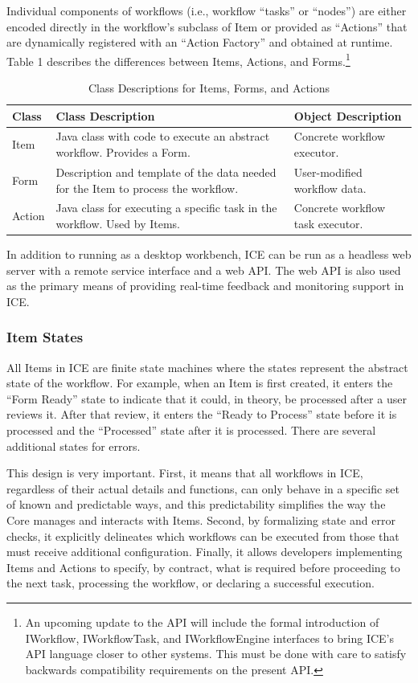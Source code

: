 Individual components of workflows (i.e., workflow ``tasks'' or
``nodes'') are either encoded directly in the workflow's subclass of
Item or provided as ``Actions'' that are dynamically registered with
an ``Action Factory'' and obtained at runtime. Table 1 describes the
differences between Items, Actions, and Forms.\footnote{An upcoming 
update to the API will include the formal introduction of
IWorkflow, IWorkflowTask, and IWorkflowEngine interfaces to bring ICE's
API language closer to other systems. This must be done with care to
satisfy backwards compatibility requirements on the present API.}

\begin{table}[t]
\begin{tabularx}{\textwidth}{|l|X|l|}
\hline
Class & Class Description & Object Description\tabularnewline\hline
Item & Java class with code to execute an abstract workflow. Provides a
Form. & Concrete workflow executor.\tabularnewline\hline
Form & Description and template of the data needed for the Item to
process the workflow. & User-modified workflow data.\tabularnewline\hline
Action & Java class for executing a specific task in the workflow. Used
by Items. & Concrete workflow task executor.\tabularnewline\hline
\end{tabularx}
\caption{Class Descriptions for Items, Forms, and Actions}
\end{table}

In addition to running as a desktop workbench, ICE can be run as a
headless web server with a remote service interface and a web
API. The web API is also used as the primary means of providing real-time 
feedback and monitoring support in ICE.

\subsubsection{Item States}\label{item-states}

All Items in ICE are finite state machines where the states represent
the abstract state of the workflow. For example, when an Item is first
created, it enters the ``Form Ready'' state to indicate that it could,
in theory, be processed after a user reviews it. After that review, it
enters the ``Ready to Process'' state before it is processed and 
the ``Processed'' state after it is processed. There are several additional 
states for errors.

This design is very important. First, it means that all workflows in
ICE, regardless of their actual details and functions, can only behave in
a specific set of known and predictable ways, and this predictability 
simplifies the way the Core manages and interacts with Items. Second, by
formalizing state and error checks, it explicitly delineates which workflows 
can be executed from those that must receive additional configuration. 
Finally, it allows developers implementing Items and
Actions to specify, by contract, what is required before proceeding to the
next task, processing the workflow, or declaring a successful execution.

